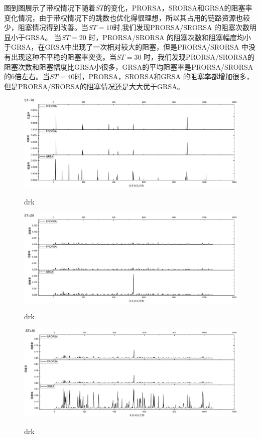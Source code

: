 图到图展示了带权情况下随着$ST$的变化，PRORSA，SRORSA和GRSA的阻塞率变化情况，由于带权情况下的跳数也优化得很理想，所以其占用的链路资源也较少，阻塞情况得到改善。当$ST=10$时,我们发现PRORSA/SRORSA 的阻塞次数明显小于GRSA。 当$ST=20$ 时，PRORSA/SRORSA 的阻塞次数和阻塞幅度均小于GRSA，在GRSA中出现了一次相对较大的阻塞，但是PRORSA/SRORSA 中没有出现这种不平稳的阻塞率突变。当$ST=30$ 时，我们发现PRORSA/SRORSA的阻塞次数和阻塞幅度比GRSA小很多，GRSA的平均阻塞率是PRORSA/SRORSA的6倍左右。当$ST=40$时，PRORSA，SRORSA和GRSA 的阻塞率都增加很多，但是PRORSA/SRORSA的阻塞情况还是大大优于GRSA。
\begin{figure}
\setlength{\belowcaptionskip}{-0.5cm}
  \begin{center}
    {\includegraphics[width=1 \textwidth]{figures/H10Z.pdf}}
    \end{center}
  \caption{{\footnotesize{drk}}}
  \label{drk}
\end{figure}
\begin{figure}
\setlength{\belowcaptionskip}{-0.5cm}
  \begin{center}
    {\includegraphics[width=1 \textwidth]{figures/H20Z.pdf}}
    \end{center}
  \caption{{\footnotesize{drk}}}
  \label{drk}
\end{figure}
\begin{figure}
\setlength{\belowcaptionskip}{-0.5cm}
  \begin{center}
    {\includegraphics[width=1 \textwidth]{figures/H30Z.pdf}}
    \end{center}
  \caption{{\footnotesize{drk}}}
  \label{drk}
\end{figure}
